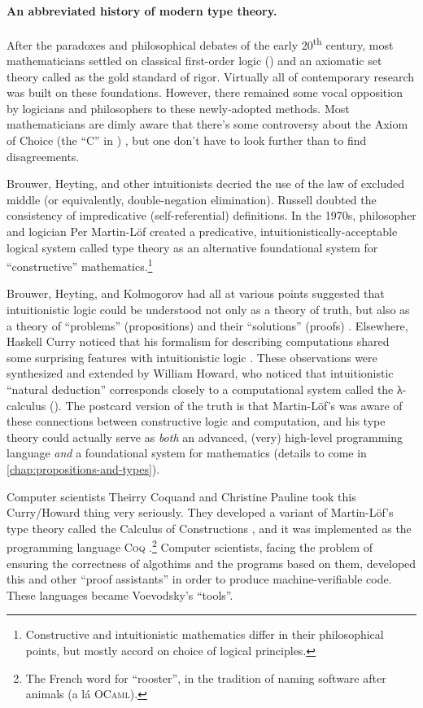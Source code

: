 \documentclass[12pt,twoside]{reedthesis}
\let\oldindex\index
\renewcommand{\index}[1]
               {\oldindex{#1}\marginpar{\footnotesize\color{index}index: #1}}
\newcommand{\indeX}{\oldindex}
\newcommand{\indeX}{\index}
\newcommand{\software}[1]{{\textsc{#1}}\indeX{#1}}
\newcommand{\Coq}{\software{Coq}}
\begin{document}
\paragraph{An abbreviated history of modern type theory.} After the paradoxes
and philosophical debates of the early 20\textsuperscript{th} century, most
mathematicians settled on classical first-order logic (\FOL{}) and an axiomatic
set theory called \ZFC{} as the gold standard of rigor. Virtually all of
contemporary research was built on these foundations. However, there remained
some vocal opposition by logicians and philosophers to these newly-adopted
methods. Most mathematicians are dimly aware that there's some controversy about
the Axiom of Choice (the ``C'' in \ZFC{}) \cite{martin-lof-100-years}, but one
don't have to look further than \FOL{} to find disagreements.

Brouwer, Heyting, and other intuitionists decried the use of the law
of excluded middle (or equivalently, double-negation elimination). Russell
doubted the consistency of impredicative (self-referential) definitions.
In the 1970s, philosopher and logician Per Martin-Löf created a predicative,
intuitionistically-acceptable logical system called type theory as an
alternative foundational system for ``constructive''
mathematics.\footnote{Constructive and intuitionistic mathematics differ in
their philosophical points, but mostly accord on choice of logical principles.}

Brouwer, Heyting, and Kolmogorov had all at various points suggested that
intuitionistic logic could be understood not only as a theory of truth, but also
as a theory of ``problems'' (propositions) and their ``solutions'' (proofs)
\cite{kolmogorov}. Elsewhere, Haskell Curry noticed that his formalism for
describing computations shared some surprising features with intuitionistic
logic \cite{curry-howard}. These observations were synthesized and extended by
William Howard, who noticed that intuitionistic ``natural deduction''
corresponds closely to a computational system called the λ-calculus (\LC{}).
The postcard version of the truth is that Martin-Löf's was aware of these
connections between constructive logic and computation, and his type theory
could actually serve as \textit{both} an advanced, (very) high-level programming
language \textit{and} a foundational system for mathematics (details to come in
\cref{chap:propositions-and-types}).

Computer scientists Theirry Coquand and Christine Pauline took this Curry/Howard
thing very seriously. They developed a variant of Martin-Löf's type theory called
the Calculus of Constructions \cite{coquand}, and it was implemented as the
programming language \Coq{} \cite{coq-manual}.\footnote{The French word for
``rooster'', in the tradition of naming software after animals (a lá
\software{OCaml}).} Computer scientists, facing the problem of ensuring the
correctness of algothims and the programs based on them, developed this and
other ``proof assistants'' in order to produce machine-verifiable code. These
languages became Voevodsky's ``tools''.
\end{document}
